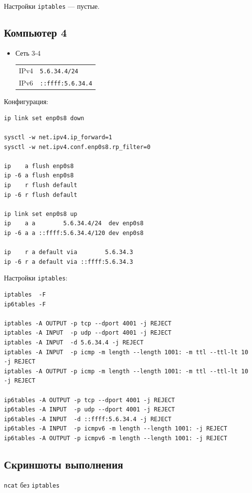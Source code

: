 Настройки \texttt{iptables} --- пустые.

\subsection{Компьютер 4}
\begin{itemize}
    \item Сеть 3-4

    \begin{tabular}{ll}
        IPv4 & \texttt{5.6.34.4/24}     \\
        IPv6 & \texttt{::ffff:5.6.34.4} \\
    \end{tabular}
\end{itemize}

Конфигурация:
\begin{verbatim}
ip link set enp0s8 down

sysctl -w net.ipv4.ip_forward=1
sysctl -w net.ipv4.conf.enp0s8.rp_filter=0

ip    a flush enp0s8
ip -6 a flush enp0s8
ip    r flush default
ip -6 r flush default

ip link set enp0s8 up
ip    a a        5.6.34.4/24  dev enp0s8
ip -6 a a ::ffff:5.6.34.4/120 dev enp0s8

ip    r a default via        5.6.34.3
ip -6 r a default via ::ffff:5.6.34.3
\end{verbatim}

Настройки \texttt{iptables}:
\begin{verbatim}
iptables  -F
ip6tables -F

iptables -A OUTPUT -p tcp --dport 4001 -j REJECT
iptables -A INPUT  -p udp --dport 4001 -j REJECT
iptables -A INPUT  -d 5.6.34.4 -j REJECT
iptables -A INPUT  -p icmp -m length --length 1001: -m ttl --ttl-lt 10 -j REJECT
iptables -A OUTPUT -p icmp -m length --length 1001: -m ttl --ttl-lt 10 -j REJECT

ip6tables -A OUTPUT -p tcp --dport 4001 -j REJECT
ip6tables -A INPUT  -p udp --dport 4001 -j REJECT
ip6tables -A INPUT  -d ::ffff:5.6.34.4 -j REJECT
ip6tables -A INPUT  -p icmpv6 -m length --length 1001: -j REJECT
ip6tables -A OUTPUT -p icmpv6 -m length --length 1001: -j REJECT
\end{verbatim}

\subsection{Скриншоты выполнения}
\texttt{ncat} без \texttt{iptables}


